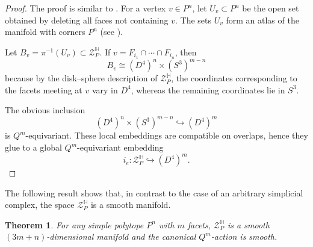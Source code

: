 \documentclass[11pt,a4paper]{article}
\numberwithin{equation}{section}
\newtheorem{thm}[definition]{Theorem}
\theoremstyle{named}
\begin{document}
\begin{proof}
The proof is similar to \cite[Lemma~6.6]{bp}. For a vertex \(v\in P^n\), let \(U_v\subset P^n\) be the open set obtained by deleting all faces not containing \(v\). The sets \(U_v\) form an atlas of the manifold with corners \(P^n\) (see \cite[Construction~5.8]{bp}).

Let \(B_v=\pi^{-1}(U_v)\subset \mathcal Z_P^{\mathbb H}\). If \(v=F_{i_1}\cap\cdots\cap F_{i_n}\), then 
\[B_v\cong (D^4)^n\times (S^3)^{m-n}\] 
because by the disk--sphere description of \(\mathcal Z_P^{\mathbb H}\), the coordinates corresponding to the facets meeting at \(v\) vary in \(D^4\), whereas the remaining coordinates lie in \(S^3\). 

The obvious inclusion
\[
(D^4)^n\times (S^3)^{m-n}
\hookrightarrow
(D^4)^m
\]
is \(Q^m\)-equivariant. These local embeddings are compatible on overlaps, hence they glue to a global \(Q^m\)-equivariant embedding
\[
i_e:\mathcal Z_P^{\mathbb H}\hookrightarrow (D^4)^m.
\]
\end{proof}


The following result shows that, in contrast to the case of an arbitrary simplicial complex, the space $\mathcal Z_P^{\mathbb H}$ is a smooth manifold.

\begin{thm}\label{thm:quaternionic-ZP-smooth}
For any simple polytope \(P^n\) with \(m\) facets, \(\mathcal Z_P^{\mathbb H}\) is a smooth \((3m+n)\)-dimensional manifold and the canonical \(Q^m\)-action is smooth.
\end{thm}
\end{document}
